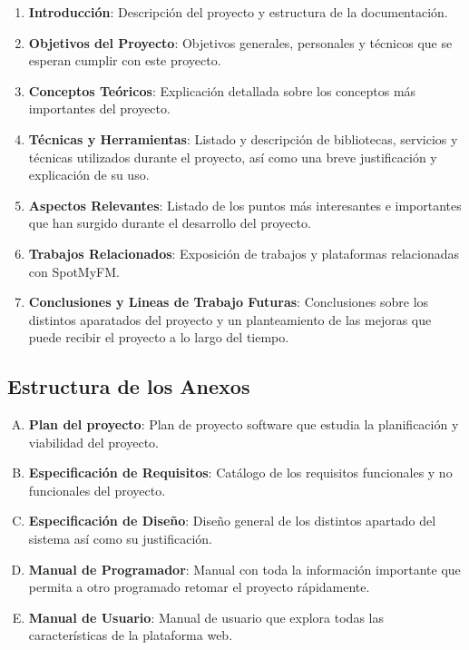 \begin{enumerate}
    \item \textbf{Introducción}: Descripción del proyecto y estructura de la documentación.
    \item \textbf{Objetivos del Proyecto}: Objetivos generales, personales y técnicos que se esperan cumplir con este proyecto.
    \item \textbf{Conceptos Teóricos}: Explicación detallada sobre los conceptos más importantes del proyecto.
    \item \textbf{Técnicas y Herramientas}: Listado y descripción de bibliotecas, servicios y técnicas utilizados durante el proyecto, así como una breve justificación y explicación de su uso. 
    \item \textbf{Aspectos Relevantes}: Listado de los puntos más interesantes e importantes que han surgido durante el desarrollo del proyecto. 
    \item \textbf{Trabajos Relacionados}: Exposición de trabajos y plataformas relacionadas con SpotMyFM. 
    \item \textbf{Conclusiones y Lineas de Trabajo Futuras}: Conclusiones sobre los distintos aparatados del proyecto y un planteamiento de las mejoras que puede recibir el proyecto a lo largo del tiempo.
\end{enumerate}



\subsection{Estructura de los Anexos}

\begin{enumerate}[A.]
    \item \textbf{Plan del proyecto}: Plan de proyecto software que estudia la planificación y viabilidad del proyecto. 
    \item \textbf{Especificación de Requisitos}: Catálogo de los requisitos funcionales y no funcionales del proyecto.
    \item \textbf{Especificación de Diseño}: Diseño general de los distintos apartado del sistema así como su justificación.
    \item \textbf{Manual de Programador}: Manual con toda la información importante que permita a otro programado retomar el proyecto rápidamente.
    \item \textbf{Manual de Usuario}: Manual de usuario que explora todas las características de la plataforma web. 
\end{enumerate}

